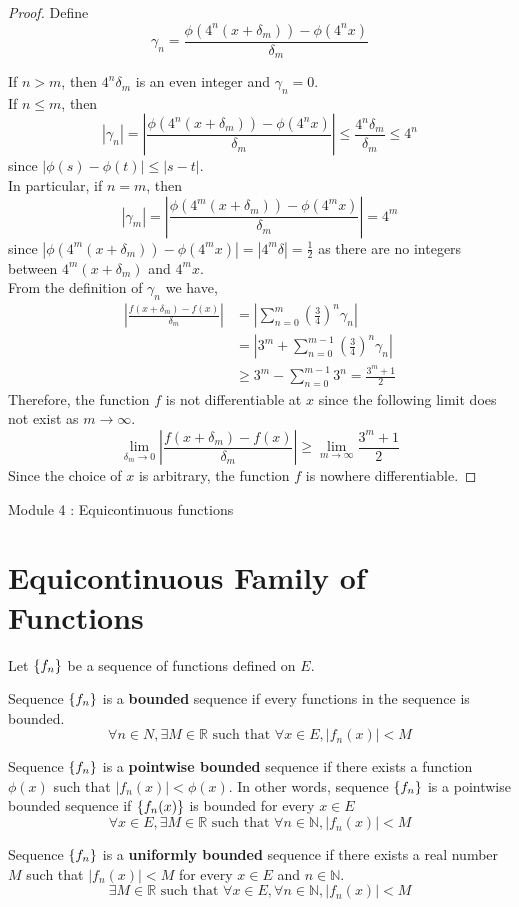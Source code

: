 \begin{proof}
	Define
	\[\gamma_n = \frac{\phi(4^n(x+\delta_m)) - \phi(4^n x)}{\delta_m} \]

	If $n > m$, then $4^n \delta_m$ is an even integer and $\gamma_n = 0$.\\
	If $n \le m$, then 
	\[ |\gamma_n| = \left|\frac{\phi(4^n(x+\delta_m)) - \phi(4^n x)}{\delta_m} \right| \le \frac{4^n \delta_m }{\delta_m} \le 4^n \]
	since $|\phi(s)-\phi(t)| \le |s-t|$.\\
	In particular, if $n = m$, then
	\[ |\gamma_m| = \left| \frac{\phi(4^m(x+\delta_m))-\phi(4^m x)}{\delta_m} \right| = 4^m \]
	since $|\phi(4^m (x+\delta_m)) - \phi(4^m x)| = |4^m \delta| = \frac{1}{2}$ as there are no integers between $4^m(x+\delta_m)$ and $4^m x$.\\

	From the definition of $\gamma_n$ we have,
	\begin{align*}
	 \left| \frac{f(x+\delta_m) - f(x)}{\delta_m} \right| 
		& = \left| \sum_{n = 0}^m \left( \frac{3}{4} \right)^n \gamma_n \right| \\
		& = \left| 3^m + \sum_{n = 0}^{m-1} \left( \frac{3}{4} \right)^n \gamma_n \right| \\
		& \ge 3^m - \sum_{n = 0}^{m-1} 3^n = \frac{3^m+1}{2}
	\end{align*}
	Therefore, the function $f$ is not differentiable at $x$ since the following limit does not exist as $m \to \infty$.
	\[ \lim_{\delta_m \to 0} \left| \frac{f(x+\delta_m) - f(x)}{\delta_m} \right| \ge \lim_{m \to \infty} \frac{3^m+1}{2} \]
	Since the choice of $x$ is arbitrary, the function $f$ is nowhere differentiable.
\end{proof}

\pagebreak

{\Large Module 4 : Equicontinuous functions}
\section{Equicontinuous Family of Functions}
\begin{definition}
	Let $\left\{f_n\right\}$ be a sequence of functions defined on $E$.\\
	{\color{red}
	Sequence $\left\{f_n\right\}$ is a \textbf{bounded} sequence if every functions in the sequence is bounded.
	\[ \forall n \in N, \exists M \in \mathbb{R} \text{ such that } \forall x \in E, |f_n(x)|<M \]

	Sequence $\left\{f_n\right\}$ is a \textbf{pointwise bounded} sequence if there exists a function $\phi(x)$ such that $|f_n(x)| < \phi(x)$.
	In other words, sequence $\left\{f_n\right\}$ is a pointwise bounded sequence if $\left\{f_n(x)\right\}$ is bounded for every $x \in E$
	\[ \forall x \in E, \exists M \in \mathbb{R} \text{ such that } \forall n \in \mathbb{N}, |f_n(x)| < M \]
	}

	Sequence $\left\{f_n\right\}$ is a \textbf{uniformly bounded} sequence if there exists a real number $M$ such that $|f_n(x)| < M$ for every $x \in E$ and $n \in \mathbb{N}$.
	\[ \exists M \in \mathbb{R} \text{ such that } \forall x \in E, \forall n \in \mathbb{N}, |f_n(x)| < M \]
\end{definition}
